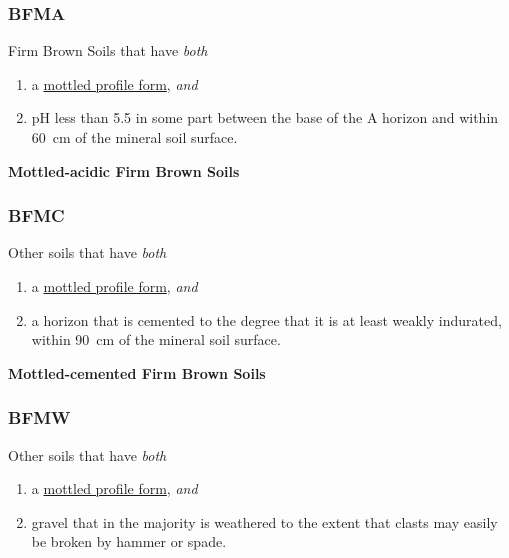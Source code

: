 \documentclass[
  letterpaper,
  DIV=11,
  numbers=noendperiod]{scrreprt}
\providecommand{\tightlist}{%
  \setlength{\itemsep}{0pt}\setlength{\parskip}{0pt}}\usepackage{longtable,booktabs,array}
\begin{document}
\hypertarget{sec-key-BFMA}{%
\subsubsection{\texorpdfstring{\textbf{BFMA}}{BFMA}}\label{sec-key-BFMA}}

Firm Brown Soils that have \emph{both}

\begin{enumerate}
\def\labelenumi{\arabic{enumi}.}
\tightlist
\item
  a \protect\hyperlink{sec-diag-mottpf}{mottled profile form},
  \emph{and}
\item
  pH less than 5.5 in some part between the base of the A horizon and
  within 60~cm of the mineral soil surface.
\end{enumerate}

\textbf{Mottled-acidic Firm Brown Soils}

\hypertarget{sec-key-BFMC}{%
\subsubsection{\texorpdfstring{\textbf{BFMC}}{BFMC}}\label{sec-key-BFMC}}

Other soils that have \emph{both}

\begin{enumerate}
\def\labelenumi{\arabic{enumi}.}
\tightlist
\item
  a \protect\hyperlink{sec-diag-mottpf}{mottled profile form},
  \emph{and}
\item
  a horizon that is cemented to the degree that it is at least weakly
  indurated, within 90~cm of the mineral soil surface.
\end{enumerate}

\textbf{Mottled-cemented Firm Brown Soils}

\hypertarget{sec-key-BFMW}{%
\subsubsection{\texorpdfstring{\textbf{BFMW}}{BFMW}}\label{sec-key-BFMW}}

Other soils that have \emph{both}

\begin{enumerate}
\def\labelenumi{\arabic{enumi}.}
\tightlist
\item
  a \protect\hyperlink{sec-diag-mottpf}{mottled profile form},
  \emph{and}
\item
  gravel that in the majority is weathered to the extent that clasts may
  easily be broken by hammer or spade.
\end{enumerate}
\end{document}
